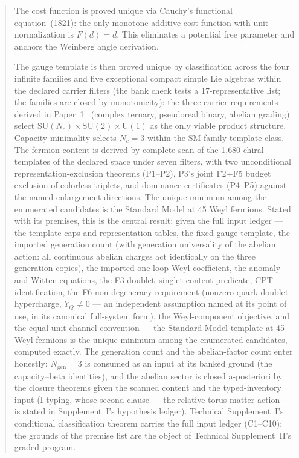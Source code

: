 \documentclass[11pt]{article}
\newcommand{\SU}{\mathrm{SU}}
\newcommand{\U}{\mathrm{U}}
\begin{document}
\begin{abstract}
The cost function is proved unique via Cauchy's functional equation~(1821): the only monotone additive cost function with unit normalization is $F(d) = d$.  This eliminates a potential free parameter and anchors the Weinberg angle derivation.

The gauge template is then proved unique by classification across the four infinite families and five exceptional compact simple Lie algebras within the declared carrier filters (the bank check tests a 17-representative list; the families are closed by monotonicity): the three carrier requirements derived in Paper~1~\cite{BrookePaper1} (complex ternary, pseudoreal binary, abelian grading) select $\SU(N_c) \times \SU(2) \times \U(1)$ as the only viable product structure.  Capacity minimality selects $N_c = 3$ within the SM-family template class.  The fermion content is derived by complete scan of the 1{,}680 chiral templates of the declared space under seven filters, with two unconditional representation-exclusion theorems (P1--P2), P3's joint F2$+$F5 budget exclusion of colorless triplets, and dominance certificates (P4--P5) against the named enlargement directions.  The unique minimum among the enumerated candidates is the Standard Model at 45 Weyl fermions.  Stated with its premises, this is the central result: given the full input ledger --- the template caps and representation tables, the fixed gauge template, the imported generation count (with generation universality of the abelian action: all continuous abelian charges act identically on the three generation copies), the imported one-loop Weyl coefficient, the anomaly and Witten equations, the F3 doublet--singlet content predicate, CPT identification, the F6 non-degeneracy requirement (nonzero quark-doublet hypercharge, $Y_Q \neq 0$ --- an independent assumption named at its point of use, in its canonical full-system form), the Weyl-component objective, and the equal-unit channel convention --- the Standard-Model template at 45 Weyl fermions is the unique minimum among the enumerated candidates, computed exactly.  The generation count and the abelian-factor count enter honestly: $N_{\mathrm{gen}} = 3$ is consumed as an input at its banked ground (the capacity--beta identities), and the abelian sector is closed a-posteriori by the closure theorems given the scanned content and the typed-inventory input (I-typing, whose second clause --- the relative-torus matter action --- is stated in Supplement~I's hypothesis ledger).  Technical Supplement~I's conditional classification theorem carries the full input ledger (C1--C10); the grounds of the premise list are the object of Technical Supplement~II's graded program.


\end{abstract}
\end{document}
